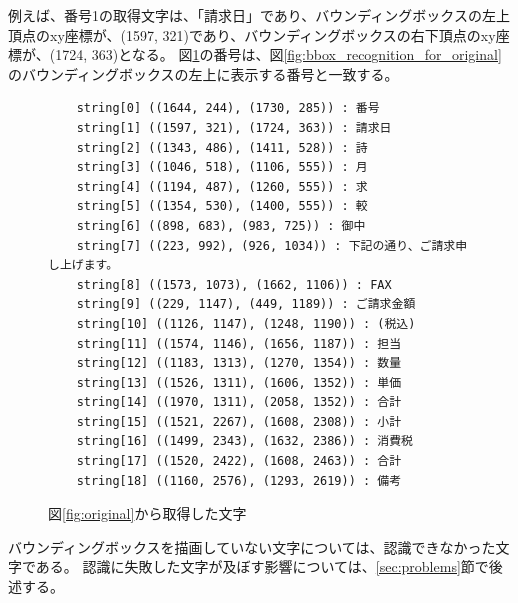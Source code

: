 例えば、番号1の取得文字は、「請求日」であり、バウンディングボックスの左上頂点のxy座標が、(1597, 321)であり、バウンディングボックスの右下頂点のxy座標が、(1724, 363)となる。
図\ref{fig:char_recognition_for_original}の番号は、図\ref{fig:bbox_recognition_for_original}のバウンディングボックスの左上に表示する番号と一致する。

\lstset{language=}
\begin{figure}[t]
    \begin{lstlisting}
    string[0] ((1644, 244), (1730, 285)) : 番号
    string[1] ((1597, 321), (1724, 363)) : 請求日
    string[2] ((1343, 486), (1411, 528)) : 詩
    string[3] ((1046, 518), (1106, 555)) : 月
    string[4] ((1194, 487), (1260, 555)) : 求
    string[5] ((1354, 530), (1400, 555)) : 較
    string[6] ((898, 683), (983, 725)) : 御中
    string[7] ((223, 992), (926, 1034)) : 下記の通り、ご請求申し上げます。
    string[8] ((1573, 1073), (1662, 1106)) : FAX
    string[9] ((229, 1147), (449, 1189)) : ご請求金額
    string[10] ((1126, 1147), (1248, 1190)) : (税込)
    string[11] ((1574, 1146), (1656, 1187)) : 担当
    string[12] ((1183, 1313), (1270, 1354)) : 数量
    string[13] ((1526, 1311), (1606, 1352)) : 単価
    string[14] ((1970, 1311), (2058, 1352)) : 合計
    string[15] ((1521, 2267), (1608, 2308)) : 小計
    string[16] ((1499, 2343), (1632, 2386)) : 消費税
    string[17] ((1520, 2422), (1608, 2463)) : 合計
    string[18] ((1160, 2576), (1293, 2619)) : 備考
    \end{lstlisting}
    \caption{図\ref{fig:original}から取得した文字}
    \label{fig:char_recognition_for_original}
\end{figure}

バウンディングボックスを描画していない文字については、認識できなかった文字である。
認識に失敗した文字が及ぼす影響については、\ref{sec:problems}節で後述する。


